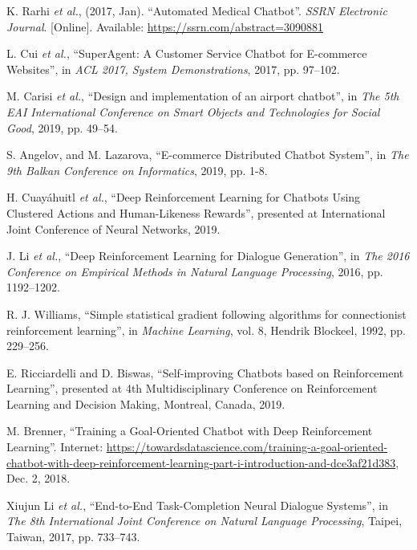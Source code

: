 \begin{thebibliography}{99}
\raggedright
K. Rarhi \textit{et al.}, (2017, Jan). \enquote{Automated Medical Chatbot}.
\textit{SSRN Electronic Journal}. [Online].
Available: \url{https://ssrn.com/abstract=3090881}

L. Cui \textit{et al.},
\enquote{SuperAgent: A Customer Service Chatbot for E-commerce Websites},
in \textit{ACL 2017, System Demonstrations}, 2017, pp. 97–102.

M. Carisi \textit{et al.}, \enquote{Design and implementation of an airport chatbot},
in \textit{The 5th EAI International Conference on Smart Objects and Technologies for Social Good}, 2019, pp. 49–54.

S. Angelov, and M. Lazarova, \enquote{E-commerce Distributed Chatbot System},
in \textit{The 9th Balkan Conference on Informatics}, 2019, pp. 1-8.

H. Cuayáhuitl \textit{et al.}, \enquote{Deep Reinforcement Learning for Chatbots
Using Clustered Actions and Human-Likeness Rewards},
presented at International Joint Conference of Neural Networks, 2019.

J. Li \textit{et al.}, \enquote{Deep Reinforcement Learning for Dialogue Generation},
in \textit{The 2016 Conference on Empirical Methods in Natural Language Processing}, 2016, pp. 1192–1202.

R. J. Williams, \enquote{Simple statistical gradient following algorithms for connectionist reinforcement learning},
in \textit{Machine Learning}, vol. 8, Hendrik Blockeel, 1992, pp. 229–256.

E. Ricciardelli and D. Biswas, \enquote{Self-improving Chatbots based on Reinforcement Learning},
presented at 4th Multidisciplinary Conference on Reinforcement Learning and Decision Making, Montreal, Canada, 2019.

M. Brenner, \enquote{Training a Goal-Oriented Chatbot with Deep Reinforcement Learning}.
Internet: \url{https://towardsdatascience.com/training-a-goal-oriented-chatbot-with-deep-reinforcement-learning-part-i-introduction-and-dce3af21d383}, Dec. 2, 2018.

Xiujun Li \textit{et al.}, \enquote{End-to-End Task-Completion Neural Dialogue Systems},
in \textit{The 8th International Joint Conference on Natural Language Processing}, Taipei, Taiwan, 2017, pp. 733–743.


\end{thebibliography}
